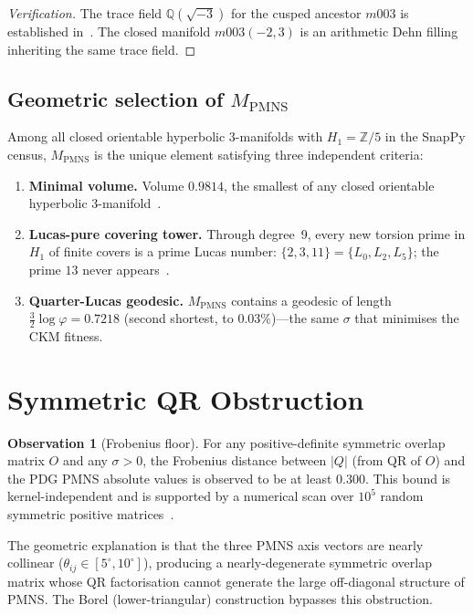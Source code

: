 \documentclass[11pt,a4paper]{article}
\theoremstyle{definition}
\newtheorem{observation}[theorem]{Observation}
\newcommand{\MPMNS}{M_{\mathrm{PMNS}}}
\newcommand{\Zfive}{\mathbb{Z}/5}
\begin{document}
\begin{proof}[Verification]
The trace field $\mathbb{Q}(\sqrt{-3})$ for the cusped ancestor
$m003$ is established in~\cite{Chinburg98}.
The closed manifold $m003(-2,3)$ is an arithmetic Dehn filling
inheriting the same trace field.
\end{proof}

\subsection{Geometric selection of \texorpdfstring{$\MPMNS$}{M-PMNS}}

Among all closed orientable hyperbolic 3-manifolds with $H_1=\Zfive$
in the SnapPy census, $\MPMNS$ is the unique element satisfying three
independent criteria:
\begin{enumerate}[(1)]
\item \textbf{Minimal volume.} Volume $0.9814$, the smallest of any
  closed orientable hyperbolic 3-manifold~\cite{GMM}.
\item \textbf{Lucas-pure covering tower.} Through degree~9, every new
  torsion prime in $H_1$ of finite covers is a prime Lucas number:
  $\{2,3,11\}=\{L_0,L_2,L_5\}$;
  the prime $13$ never appears~\cite{Gentry:FareyTower}.
\item \textbf{Quarter-Lucas geodesic.} $\MPMNS$ contains a geodesic
  of length $\frac{3}{2}\log\varphi=0.7218$ (second shortest, to
  $0.03\%$)---the same $\sigma$ that minimises the CKM fitness.
\end{enumerate}

\section{Symmetric QR Obstruction}
\label{sec:obstruction}

\begin{observation}[Frobenius floor]
\label{obs:floor}
For any positive-definite symmetric overlap matrix $O$ and any
$\sigma>0$, the Frobenius distance between $|Q|$ (from QR of $O$)
and the PDG PMNS absolute values is observed to be at least $0.300$.
This bound is kernel-independent and is supported by a numerical
scan over $10^5$ random symmetric positive matrices~\cite{Gentry:Unified}.
\end{observation}

The geometric explanation is that the three PMNS axis vectors are
nearly collinear ($\theta_{ij}\in[5^\circ,10^\circ]$), producing
a nearly-degenerate symmetric overlap matrix whose QR factorisation
cannot generate the large off-diagonal structure of PMNS.
The Borel (lower-triangular) construction bypasses this obstruction.
\end{document}
